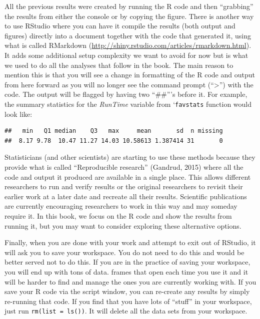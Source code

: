 \documentclass[]{book}
\newenvironment{Shaded}{\begin{snugshade}}{\end{snugshade}}
\newcommand{\KeywordTok}[1]{\textcolor[rgb]{0.13,0.29,0.53}{\textbf{{#1}}}}
\newcommand{\NormalTok}[1]{{#1}}
\begin{document}
All the previous results were created by running the R code and then
``grabbing'' the results from either the console or by copying the
figure. There is another way to use RStudio where you can have it
compile the results (both output and figures) directly into a document
together with the code that generated it, using what is called RMarkdown
(\url{http://shiny.rstudio.com/articles/rmarkdown.html}). It adds some
additional setup complexity we want to avoid for now but is what we used
to do all the analyses that follow in the book. The main reason to
mention this is that you will see a change in formatting of the R code
and output from here forward as you will no longer see the command
prompt (``\textgreater{}'') with the code. The output will be flagged by
having two ``\#\#'''s before it. For example, the summary statistics for
the \emph{RunTime} variable from `\texttt{favstats} function would look
like:

\begin{Shaded}
\end{Shaded}

\begin{verbatim}
##   min   Q1 median    Q3   max     mean       sd  n missing
##  8.17 9.78  10.47 11.27 14.03 10.58613 1.387414 31       0
\end{verbatim}

Statisticians (and other scientists) are starting to use these methods
because they provide what is called ``Reproducible research'' (Gandrud,
2015) where all the code and output it produced are available in a
single place. This allows different researchers to run and verify
results or the original researchers to revisit their earlier work at a
later date and recreate all their results. Scientific publications are
currently encouraging researchers to work in this way and may someday
require it. In this book, we focus on the R code and show the results
from running it, but you may want to consider exploring these
alternative options.

Finally, when you are done with your work and attempt to exit out of
RStudio, it will ask you to save your workspace. You do not need to do
this and would be better served not to do this. If you are in the
practice of saving your workspace, you will end up with tons of data.
frames that open each time you use it and it will be harder to find and
manage the ones you are currently working with. If you save your R code
via the script window, you can re-create any results by simply
re-running that code. If you find that you have lots of ``stuff'' in
your workspace, just run \texttt{rm(list\ =\ ls())}. It will delete all
the data sets from your workspace.
\end{document}
